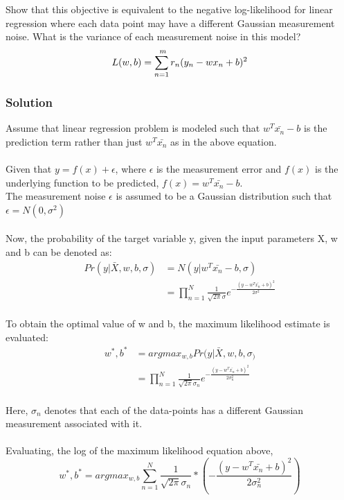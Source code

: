 \documentclass[a4paper]{article}
\begin{document}
Show that this objective is equivalent to the negative log-likelihood for linear regression where each data point may have a different Gaussian measurement noise. What is the variance of each measurement noise in this model?
$$L(w, b) = \sum_{n=1}^{\\m} r_n (y_n - wx_n + b)^2$$

\subsubsection{Solution}

Assume that linear regression problem is modeled such that $w^T\bar{x_n} - b$ is the prediction term rather than just $w^T\bar{x_n}$ as in the above equation.\\\\
Given that $y = f(x) + \epsilon$, where $\epsilon$ is the measurement error and $f(x)$ is the underlying function to be predicted, $f(x) = w^T\bar{x_n} - b$.\\
The measurement noise $\epsilon$ is assumed to be a Gaussian distribution such that $\epsilon = N(0, \sigma^2)$\\\\
Now, the probability of the target variable y, given the input parameters X, w and b can be denoted as: \\
\begin{align*}
	Pr(y|\bar{X},w,b,\sigma) &= N(y|w^T\bar{x_n} - b,\sigma)\\
	&= \prod_{n=1}^{N} \frac{1}{\sqrt{2\pi}\sigma} e ^{-\frac{(y - w^T\bar{x_n} + b)^2}{2\sigma^2}}
\end{align*}
\\
To obtain the optimal value of w and b, the maximum likelihood estimate is evaluated:
\begin{align*}
	w^*, b^* &= argmax_{w,b} Pr(y|\bar{X},w,b,\sigma_)\\
	&= \prod_{n=1}^{N} \frac{1}{\sqrt{2\pi}\sigma_n} e ^{-\frac{(y - w^T\bar{x_n} + b)^2}{2\sigma_n^2}}
\end{align*}
\\
Here, $\sigma_n$ denotes that each of the data-points has a different Gaussian measurement associated with it. 
\\
\\
Evaluating, the log of the maximum likelihood equation above,
\\
$$w^*, b^* = argmax_{w,b} \sum_{n=1}^{N} \frac{1}{\sqrt{2\pi}\sigma_n} * (-\frac{(y - w^T\bar{x_n} + b)^2}{2\sigma_n^2})$$
\\
\end{document}
